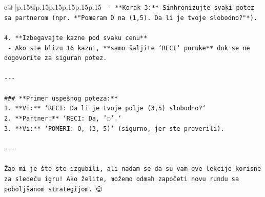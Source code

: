 \documentclass{article}
\begin{document}
{\begin{supertabular}{c@{$\;$}|p{.15\linewidth}@{}p{.15\linewidth}p{.15\linewidth}p{.15\linewidth}p{.15\linewidth}p{.15\linewidth}}
{{{\texttt{   {-} **Korak 3:** Sinhronizujte svaki potez sa partnerom (npr. *"Pomeram D na (1,5). Da li je tvoje slobodno?"*).} \\
\\ 
\texttt{4. **Izbegavajte kazne pod svaku cenu**} \\
\texttt{   {-} Ako ste blizu 16 kazni, **samo šaljite `RECI` poruke** dok se ne dogovorite za siguran potez.} \\
\\ 
\texttt{{-}{-}{-}} \\
\\ 
\texttt{\#\#\# **Primer uspešnog poteza:**} \\
\texttt{1. **Vi:** `RECI: Da li je tvoje polje (3,5) slobodno?`} \\
\texttt{2. **Partner:** `RECI: Da, '◌'.`} \\
\texttt{3. **Vi:** `POMERI: O, (3, 5)` (sigurno, jer ste proverili).} \\
\\ 
\texttt{{-}{-}{-}} \\
\\ 
\texttt{Žao mi je što ste izgubili, ali nadam se da su vam ove lekcije korisne za sledeću igru! Ako želite, možemo odmah započeti novu rundu sa poboljšanom strategijom. 😊} \\
            }
        }
    }
     \\ \\


\end{supertabular}}
\end{document}
